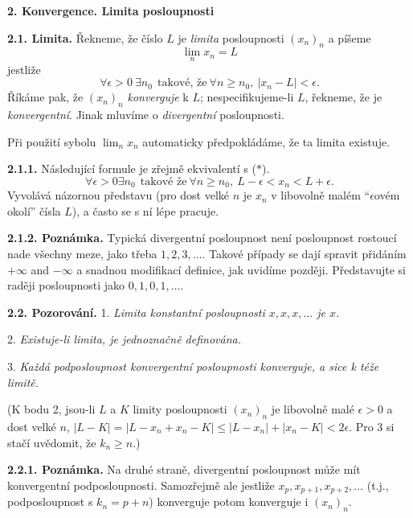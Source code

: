 \documentclass[12pt]{article}
\begin{document}
 
 
 \vskip10mm
 
  {\large\bf 2. Konvergence. Limita posloupnosti}
 
 \bigskip
 
 {\bf 2.1. Limita.} Řekneme, že číslo $L$ je {\em limita} posloupnosti $(x_n)_n$ a píšeme
 $$
 \lim_nx_n=L
 $$
jestliže
 \begin{equation}
 \forall \epsilon>0 \ \exists n_0\ \ \text{takové, že}\ \forall n\geq n_0, \ |x_n-L|<\epsilon.
 \tag{$*$}
 \end{equation}
Říkáme pak, že $(x_n)_n$ {\em konverguje} k $L$; nespecifikujeme-li $L$, řekneme, že je {\em konvergentní}. Jinak mluvíme o  {\em divergentní} posloupnosti.
 
 \smallskip
 
 Při použití sybolu $\lim_n x_n$ automaticky předpokládáme, že ta limita existuje.
 
 \medskip
 
 {\bf 2.1.1.} Následující formule je zřejmě ekvivalentí s ($*$).
 $$
 \forall \epsilon>0 \exists n_0\ \ \text{takov\'e \v ze}\ \forall n\geq n_0, \ L-\epsilon<x_n<L+\epsilon.
 $$
 Vyvolává názornou představu (pro dost velké $n$ je $x_n$  v libovolně malém ``$\epsilon$ovém okolí'' čísla $L$), a často se s ní lépe pracuje.
 
 \medskip
 
 {\bf 2.1.2. Poznámka.} Typická divergentní posloupnost není posloupnost rostoucí nade všechny meze, jako t\v reba
 $1,2,3,\dots$. Takové případy se dají spravit přidáním $+\infty$ and $-\infty$ a snadnou modifikací definice, jak uvidíme později. Představujte si raději posloupnosti jako $0,1,0,1,\dots$.
 
 \bigskip
 
 {\bf 2.2. Pozorování.} 1. {\em Limita konstantní posloupnosti $x,x,x,\dots$ je $x$.}
 
 2. {\em Existuje-li limita, je jednoznačně definována.}
 
 3. {\em Každá podposloupnost konvergentní posloupnosti konverguje, a sice k téže limitě.}
 
 (K bodu 2, jsou-li $L$ a $K$ limity posloupnosti $(x_n)_n$ je libovolně malé $\epsilon>0$ a dost velké $n$, $|L-K|=|L-x_n+x_n-K|\leq |L-x_n|+|x_n-K|<2\epsilon$.
 Pro 3 si stačí uvědomit, že $k_n\geq n$.)
 
 \medskip
 
 {\bf 2.2.1. Poznámka.} Na druhé straně, divergentní posloupnost může mít konvergentní podposloupnosti. Samozřejmě ale jestliže
 $x_p,x_{p+1},x_{p+2},\dots$ (t.j., podposloupnost s $k_n=p+n$) konverguje potom konverguje i $(x_n)_n$.
 
\end{document}
